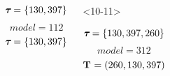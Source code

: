 \begin{frame}[t]
\begin{columns}[c]
\begin{onlyenv}
            \begin{minipage}[c][0.5\textheight][c]{\linewidth}
                \begin{displaybox}[0.95\linewidth]
                    \begin{minipage}[c][0.45\textheight][c]{0.95\linewidth}
                        \[
                            \boldsymbol{\tau_{}} = \{130,397\}
                        \]\vspace{0mm}
                        \[
                            model = 112
                        \]\vspace{0mm}
                        \[
                            \boldsymbol{\tau_{}} = \{130,397\}
                        \]\vspace{0mm}
                    \end{minipage}
                \end{displaybox}
            \end{minipage}
        \end{onlyenv}
        \begin{onlyenv}<10-11>
            \begin{minipage}[c][0.5\textheight][c]{\linewidth}
                \begin{displaybox}[0.95\linewidth]
                    \begin{minipage}[c][0.45\textheight][c]{0.95\linewidth}
                        \[
                            \boldsymbol{\tau_{}} = \{130,397,260\}
                        \]\vspace{0mm}
                        \[
                            model = 312
                        \]\vspace{0mm}
                        \[
                            \mathbf{T_{}} = (260,130,397)
                        \]\vspace{0mm}
                    \end{minipage}
                \end{displaybox}
            \end{minipage}
        \end{onlyenv}

\end{columns}
\end{frame}
